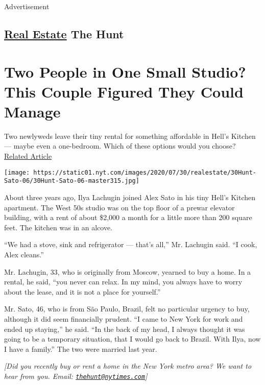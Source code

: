 Advertisement

\hypertarget{-real-estate--the-hunt}{%
\subsection{\texorpdfstring{
\href{https://www.nytimes.com/section/realestate}{Real Estate}
\textbar{}The
Hunt}{ Real Estate  \textbar{}The Hunt}}\label{-real-estate--the-hunt}}

\hypertarget{two-people-in-one-small-studio-this-couple-figured-they-could-manage}{%
\section{Two People in One Small Studio? This Couple Figured They Could
Manage}\label{two-people-in-one-small-studio-this-couple-figured-they-could-manage}}

Two newlyweds leave their tiny rental for something affordable in Hell's
Kitchen --- maybe even a one-bedroom. Which of these options would you
choose?
\href{https://www.nytimes.com/interactive/2020/07/23/realestate/23hunt-hirt.html}{Related
Article}

\texttt{[image: https://static01.nyt.com/images/2020/07/30/realestate/30Hunt-Sato-06/30Hunt-Sato-06-master315.jpg]}

About three years ago, Ilya Lachugin joined Alex Sato in his tiny Hell's
Kitchen apartment. The West 50s studio was on the top floor of a prewar
elevator building, with a rent of about \$2,000 a month for a little
more than 200 square feet. The kitchen was in an alcove.

``We had a stove, sink and refrigerator --- that's all,'' Mr. Lachugin
said. ``I cook, Alex cleans.''

Mr. Lachugin, 33, who is originally from Moscow, yearned to buy a home.
In a rental, he said, ``you never can relax. In my mind, you always have
to worry about the lease, and it is not a place for yourself.''

Mr. Sato, 46, who is from São Paulo, Brazil, felt no particular urgency
to buy, although it did seem financially prudent. ``I came to New York
for work and ended up staying,'' he said. ``In the back of my head, I
always thought it was going to be a temporary situation, that I would go
back to Brazil. With Ilya, now I have a family.'' The two were married
last year.

\emph{{[}Did you recently buy or rent a home in the New York metro area?
We want to hear from you. Email:
\href{mailto:thehunt@nytimes.com}{\nolinkurl{thehunt@nytimes.com}}{]}}

